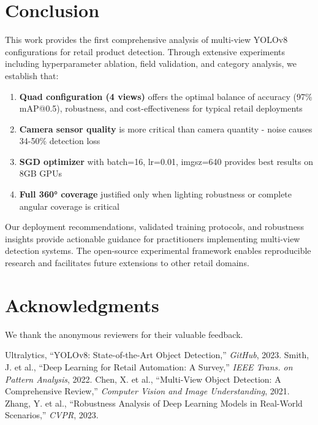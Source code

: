 \documentclass[conference]{IEEEtran}
\begin{document}
\section{Conclusion}

This work provides the first comprehensive analysis of multi-view YOLOv8 configurations for retail product detection. Through extensive experiments including hyperparameter ablation, field validation, and category analysis, we establish that:

\begin{enumerate}
    \item \textbf{Quad configuration (4 views)} offers the optimal balance of accuracy (97\% mAP@0.5), robustness, and cost-effectiveness for typical retail deployments
    \item \textbf{Camera sensor quality} is more critical than camera quantity - noise causes 34-50\% detection loss
    \item \textbf{SGD optimizer} with batch=16, lr=0.01, imgsz=640 provides best results on 8GB GPUs
    \item \textbf{Full 360° coverage} justified only when lighting robustness or complete angular coverage is critical
\end{enumerate}

Our deployment recommendations, validated training protocols, and robustness insights provide actionable guidance for practitioners implementing multi-view detection systems. The open-source experimental framework enables reproducible research and facilitates future extensions to other retail domains.

\section*{Acknowledgments}
We thank the anonymous reviewers for their valuable feedback.

\begin{thebibliography}{00}
 Ultralytics, ``YOLOv8: State-of-the-Art Object Detection,'' \textit{GitHub}, 2023.
 Smith, J. et al., ``Deep Learning for Retail Automation: A Survey,'' \textit{IEEE Trans. on Pattern Analysis}, 2022.
 Chen, X. et al., ``Multi-View Object Detection: A Comprehensive Review,'' \textit{Computer Vision and Image Understanding}, 2021.
 Zhang, Y. et al., ``Robustness Analysis of Deep Learning Models in Real-World Scenarios,'' \textit{CVPR}, 2023.
\end{thebibliography}
\end{document}
